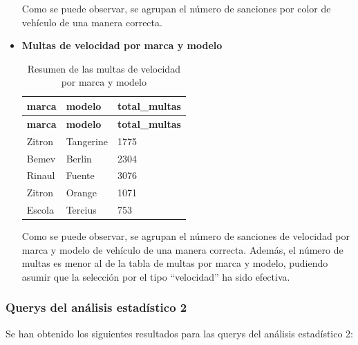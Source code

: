 \documentclass[]{article}
\begin{document}
\begin{itemize}
Como se puede observar, se agrupan el número de sanciones por color de vehículo de una manera correcta.

    \item \textbf{Multas de velocidad por marca y modelo}

\begin{table}[H]
\begin{longtable}{l l l}
    \hline
    \textbf{marca} & \textbf{modelo} & \textbf{total\_multas} \\ \hline
    \endfirsthead
    
    \hline
    \textbf{marca} & \textbf{modelo} & \textbf{total\_multas} \\ \hline
    \endhead
    
    Zitron & Tangerine & 1775 \\ \hline
    Bemev & Berlin & 2304 \\ \hline
    Rinaul & Fuente & 3076 \\ \hline
    Zitron & Orange & 1071 \\ \hline
    Escola & Tercius & 753 \\ \hline
\end{longtable}
\caption{Resumen de las multas de velocidad por marca y modelo}
\end{table}

Como se puede observar, se agrupan el número de sanciones de velocidad por marca y modelo de vehículo de una manera correcta. Además, el número de multas es menor al de la tabla de multas por marca y modelo, pudiendo asumir que la selección por el tipo ``velocidad'' ha sido efectiva.

\end{itemize}

\subsubsection{Querys del análisis estadístico 2}
Se han obtenido los siguientes resultados para las querys del análisis estadístico 2:
\end{document}
